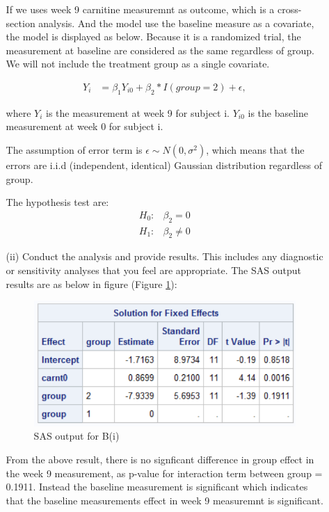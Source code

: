 \begin{itemize}
\begin{itemize}
If we uses week 9 carnitine measuremnt as outcome, which is a cross-section analysis. And the model use the baseline measure as a covariate, the model is displayed as below. 
Because it is a randomized trial, the measurement at baseline are considered as the same regardless of group. We will not include the treatment group as a single covariate.

\begin{align*}
Y_{i} &=  \beta_{1} Y_{i0} +  \beta_{2}* I (group= 2) + \epsilon,
\end{align*}

where $Y_{i} $ is the measurement at week 9 for subject i. $Y_{i0}$ is the baseline measurement at week 0 for subject i. 

The assumption of error term is $\epsilon \sim N(0, \sigma^2)$, which means that the errors are i.i.d (independent, identical) Gaussian distribution regardless of group. 

The hypothesis test are:
\begin{align*}
H_0: & \beta_2 = 0 \\
H_1: & \beta_2 \neq 0
\end{align*}

													\vspace{0.2cm}
												  \item[(ii)] Conduct the analysis and provide results.	This includes any diagnostic or sensitivity analyses
																			that you feel are appropriate.
The SAS output results are as below in figure (Figure \ref{fig:b1}):
\begin{figure}[h]
    \centering
    \includegraphics[scale=1]{HW4/img/b1.png}
    \caption{SAS output for B(i)}
\label{fig:b1}
\end{figure}

From the above result, there is no signficant difference in group effect in the week 9 measurement, as p-value for interaction term between group = 0.1911. Instead the baseline measurement is significant which indicates that the baseline measurements effect in week 9 measuremnt is significant. 


\end{itemize}
\end{itemize}
